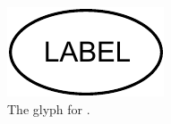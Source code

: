 \begin{figure}[H]
  \centering
  \includegraphics{images/unspecified}
  \caption{The \PD glyph for .}
  \label{fig:unspecified}
\end{figure}

